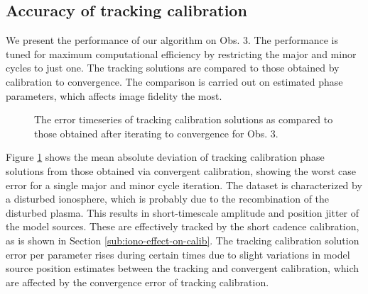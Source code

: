 \documentclass{aa}
\begin{document}
\subsection{Accuracy of tracking calibration}
We present the performance of our  algorithm on Obs. 3. The performance is tuned
for maximum computational  efficiency by restricting the major  and minor cycles
to  just  one.   The  tracking  solutions  are compared  to  those  obtained  by
calibration to  convergence.  The comparison  is carried out on  estimated phase
parameters, which affects image fidelity the most.
\begin{figure}[tbh]

\caption{\label{fig:The-error-timeseries}The error timeseries of tracking
calibration solutions as compared to those obtained after iterating
to convergence for Obs. 3.}
\end{figure}

Figure  \ref{fig:The-error-timeseries}  shows  the  mean absolute  deviation  of
tracking  calibration  phase  solutions   from  those  obtained  via  convergent
calibration, showing  the worst case  error for a  single major and  minor cycle
iteration.  The  dataset is  characterized by a  disturbed ionosphere,  which is
probably  due to the  recombination of  the disturbed  plasma.  This  results in
\mbox{short-timescale}  amplitude  and position  jitter  of  the model  sources.
These are effectively  tracked by the short cadence calibration,  as is shown in
Section \ref{sub:iono-effect-on-calib}.  The tracking calibration solution error
per  parameter rises  during certain  times due  to slight  variations  in model
source position estimates between the tracking and convergent calibration, which
are affected by the convergence error of tracking calibration.
\end{document}
